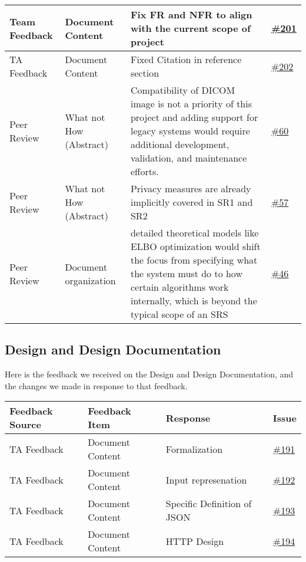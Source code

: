 \documentclass{article}
\begin{document}
\begin{longtable}{| p{} | p{} | p{} | p{} |}
    \hline
    Team Feedback & Document Content & Fix FR and NFR to align with the current scope of project & \href{https://github.com/RezaJodeiri/CXR-Capstone/issues/201}{\#201}\\
    \hline
    TA Feedback & Document Content & Fixed Citation in reference section  & \href{https://github.com/RezaJodeiri/CXR-Capstone/issues/202}{\#202}\\
    \hline
    Peer Review & What not How (Abstract) & Compatibility of DICOM image is not a priority of this project and adding support for legacy systems would require additional development, validation, and maintenance efforts. & \href{https://github.com/RezaJodeiri/CXR-Capstone/issues/60}{\#60}\\
    \hline
    Peer Review & What not How (Abstract) & Privacy measures are already implicitly covered in SR1 and SR2  & \href{https://github.com/RezaJodeiri/CXR-Capstone/issues/57}{\#57} \\
    Peer Review & Document organization & detailed theoretical models like ELBO optimization would shift the focus from specifying what the system must do to how certain algorithms work internally, which is beyond the typical scope of an SRS  & \href{https://github.com/RezaJodeiri/CXR-Capstone/issues/46}{\#46} \\
    

\end{longtable}

\subsection{Design and Design Documentation}

Here is the feedback we received on the Design and Design Documentation, and the changes we made in response to that feedback.
\begin{longtable}{| p{} | p{} | p{} | p{} |}
\hline
\textbf{Feedback Source} & \textbf{Feedback Item} & \textbf{Response} & \textbf{Issue} \\
\hline
TA Feedback & Document Content & Formalization  & \href{https://github.com/RezaJodeiri/CXR-Capstone/issues/191}{\#191} \\
\hline
TA Feedback & Document Content & Input represenation & \href{https://github.com/RezaJodeiri/CXR-Capstone/issues/192}{\#192} \\
\hline
TA Feedback & Document Content & Specific Definition of JSON & \href{https://github.com/RezaJodeiri/CXR-Capstone/issues/193}{\#193} \\
\hline
TA Feedback & Document Content & HTTP Design & \href{https://github.com/RezaJodeiri/CXR-Capstone/issues/194}{\#194} \\
\hline
\end{longtable}
\end{document}
